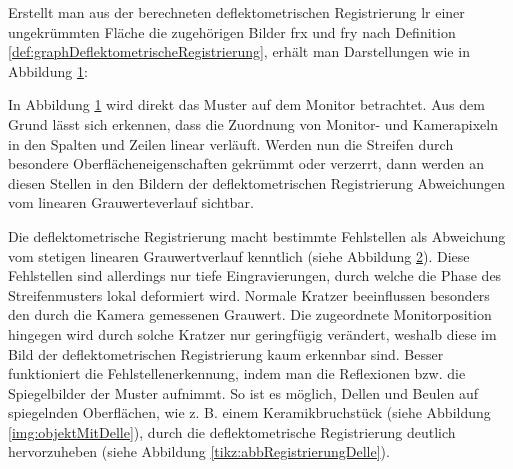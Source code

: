 \p
Erstellt man aus der berechneten deflektometrischen Registrierung \acrshort{lr} einer ungekrümmten Fläche die zugehörigen Bilder \acrshort{frx} und \acrshort{fry} nach Definition \ref{def:graphDeflektometrischeRegistrierung}, erhält man Darstellungen wie in Abbildung \ref{tikz:abbOptimaleSpaltenZeilenReg}:

{
	\begin{figure}[H]
		\centering
		
		\label{tikz:abbOptimaleSpaltenZeilenReg}
	\end{figure}
}

\noindent
In Abbildung \ref{tikz:abbOptimaleSpaltenZeilenReg} wird direkt das Muster auf dem Monitor betrachtet.
Aus dem Grund lässt sich erkennen, dass die Zuordnung von Monitor- und Kamerapixeln in den Spalten und Zeilen linear verläuft.
Werden nun die Streifen durch besondere Oberflächeneigenschaften gekrümmt oder verzerrt, dann werden an diesen Stellen in den Bildern der deflektometrischen Registrierung Abweichungen vom linearen Grauwerteverlauf sichtbar.

{
	\begin{figure}[H]
		\centering
		
		\label{tikz:abbBrillenglasRegistrierung}
	\end{figure}
}

\noindent
Die deflektometrische Registrierung macht bestimmte Fehlstellen als Abweichung vom stetigen linearen Grauwertverlauf kenntlich (siehe Abbildung \ref{tikz:abbBrillenglasRegistrierung}).
Diese Fehlstellen sind allerdings nur tiefe Eingravierungen, durch welche die Phase des Streifenmusters lokal deformiert wird.
Normale Kratzer beeinflussen besonders den durch die Kamera gemessenen Grauwert.
Die zugeordnete Monitorposition hingegen wird durch solche Kratzer nur geringfügig verändert, weshalb diese im Bild der deflektometrischen Registrierung kaum erkennbar sind.
Besser funktioniert die Fehlstellenerkennung, indem man die Reflexionen bzw. die Spiegelbilder der Muster aufnimmt.
So ist es möglich, Dellen und Beulen auf spiegelnden Oberflächen, wie z. B. einem Keramikbruchstück (siehe Abbildung \ref{img:objektMitDelle}), durch die deflektometrische Registrierung deutlich hervorzuheben (siehe Abbildung \ref{tikz:abbRegistrierungDelle}).


